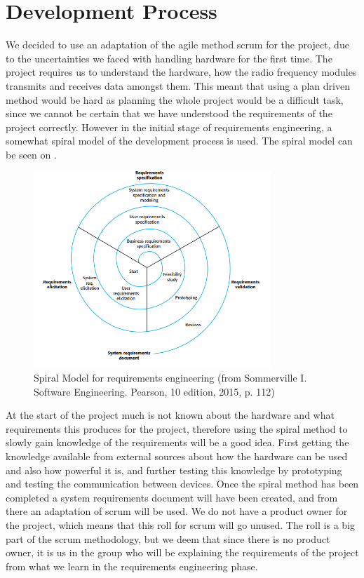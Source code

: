 \chapter{Development Process}
We decided to use an adaptation of the agile method scrum for the project, due to the uncertainties we faced with handling hardware for the first time. The project requires us to understand the hardware, how the radio frequency modules transmits and receives data amongst them. This meant that using a plan driven method would be hard as planning the whole project would be a difficult task, since we cannot be certain that we have understood the requirements of the project correctly.
However in the initial stage of requirements engineering, a somewhat spiral model of the development process is used. The spiral model can be seen on .

\begin{figure}[ht]
\centering
\includegraphics[width=0.80\textwidth]{Figures/spiral.png}
\caption{Spiral Model for requirements engineering (from Sommerville I. Software Engineering. Pearson, 10 edition, 2015, p. 112)}\label{fig:spiralDiagram}
\end{figure}

At the start of the project much is not known about the hardware and what requirements this produces for the project, therefore using the spiral method to slowly gain knowledge of the requirements will be a good idea. First getting the knowledge available from external sources about how the hardware can be used and also how powerful it is, and further testing this knowledge by prototyping and testing the communication between devices. 
Once the spiral method has been completed a system requirements document will have been created, and from there an adaptation of scrum will be used.
We do not have a product owner for the project, which means that this roll for scrum will go unused. The roll is a big part of the scrum methodology, but we deem that since there is no product owner, it is us in the group who will be explaining the requirements of the project from what we learn in the requirements engineering phase. 

